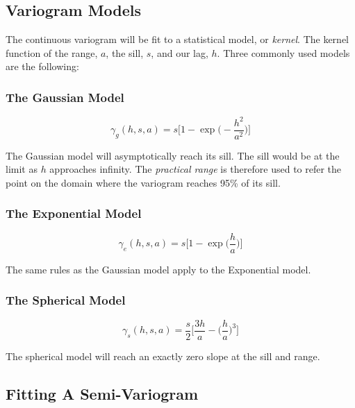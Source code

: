 \subsection{Variogram Models}
The continuous variogram will be fit to a statistical model, or \textit{kernel}. The kernel function of the range, $a$, the sill, $s$, and our lag, $h$. Three commonly used models are the following: %
\subsubsection{The Gaussian Model}

\begin{equation}
	\gamma_g(h, s, a) = s \Bigg[ 1 - \exp \Bigg( -\dfrac{h^2}{a^2} \Bigg) \Bigg]
	\label{eq:gauss_model}
\end{equation}

The Gaussian model will asymptotically reach its sill. The sill would be at the limit as $h$ approaches infinity. The \textit{practical range} is therefore used to refer the point on the domain where the variogram reaches 95\% of its sill.

\subsubsection{The Exponential Model}

\begin{equation}
	\gamma_e(h, s, a) = s \Bigg[ 1 - \exp \Bigg( \dfrac{h}{a} \Bigg) \Bigg]
	\label{eq:exp_model}
\end{equation}

The same rules as the Gaussian model apply to the Exponential model.

\subsubsection{The Spherical Model}

\begin{equation}
	\gamma_s(h, s, a) = \frac{s}{2} \Bigg[ \dfrac{3h}{a} - \Bigg( \dfrac{h}{a} \Bigg)^3 \Bigg]
	\label{eq:sph_model}
\end{equation}

The spherical model will reach an exactly zero slope at the sill and range.

\subsection{Fitting A Semi-Variogram} \label{sec:varfit}

